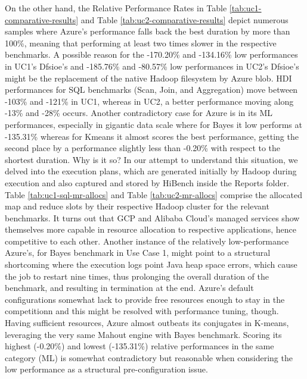 \documentclass[review]{elsarticle}
\begin{document}
On the other hand, the Relative Performance Rates in Table \ref{tab:uc1-comparative-results} and Table \ref{tab:uc2-comparative-results} depict numerous samples where Azure's performance falls back the best duration by more than 100\%, meaning that performing at least two times slower in the respective benchmarks. A possible reason for the -170.20\% and -134.16\% low performances in UC1's Dfsioe's and -185.76\% and -80.57\% low performances in UC2's Dfsioe's might be the replacement of the native Hadoop filesystem by Azure blob. HDI performances for SQL benchmarks (Scan, Join, and Aggregation) move between -103\% and -121\% in UC1, whereas in UC2, a better performance moving along -13\% and -28\% occurs. Another contradictory case for Azure is in its ML performances, especially in gigantic data scale where for Bayes it low performs at -135.31\% whereas for Kmeans it almost scores the best performance, getting the second place by a performance slightly less than -0.20\% with respect to the shortest duration. Why is it so? In our attempt to understand this situation, we delved into the execution plans, which are generated initially by Hadoop during execution and also captured and stored by HiBench inside the Reports folder. Table \ref{tab:uc1-sql-mr-allocs} and Table \ref{tab:uc2-mr-allocs} comprise the allocated map and reduce slots by their respective Hadoop cluster for the relevant benchmarks. It turns out that GCP and Alibaba Cloud's managed services show themselves more capable in resource allocation to respective applications, hence competitive to each other. Another instance of the relatively low-performance Azure's, for Bayes benchmark in Use Case 1, might point to a structural shortcoming where the execution logs point Java heap space errors, which cause the job to restart nine times, thus prolonging the overall duration of the benchmark, and resulting in termination at the end. Azure's default configurations somewhat lack to provide free resources enough to stay in the competitionn and this might be resolved with performance tuning, though. Having sufficient resources, Azure almost outbeats its conjugates in K-means, leveraging the very same Mahout engine with Bayes benchmark. Scoring its highest (-0.20\%) and lowest (-135.31\%) relative performances in the same category (ML) is somewhat contradictory but reasonable when considering the low performance as a structural pre-configuration issue.
\end{document}
